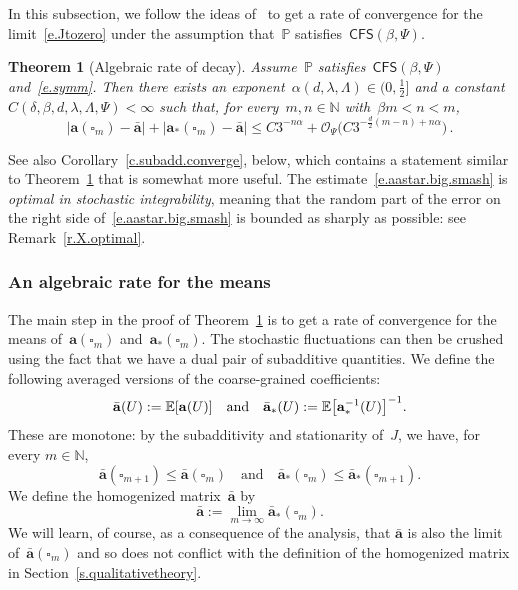 \documentclass[11pt]{article} %
\let\oldsquare\square %
\renewcommand{\square}{\oldsquare}
\numberwithin{equation}{section}
\newtheorem{theorem}{Theorem}[section]
\theoremstyle{definition}
\let\originalleft\left
\let\originalright\right
\renewcommand{\left}{\mathopen{}\mathclose\bgroup\originalleft}
\renewcommand{\right}{\aftergroup\egroup\originalright}
\newcommand*{\N}{\ensuremath{\mathbb{N}}}
\renewcommand{\a}{\mathbf{a}}
\newcommand{\ahom}{\bar{\a}}
\newcommand{\cu}{\square}
\renewcommand{\P}{\mathbb{P}}
\newcommand{\E}{\mathbb{E}}
\renewcommand{\O}{\mathcal{O}}
\newcommand{\CFS}{\mathsf{CFS}}
\begin{document}
In this subsection, we follow the ideas of~\cite{AS,AKMBook} to get a rate of convergence for the limit~\eqref{e.Jtozero} under the assumption that~$\P$ satisfies~$\CFS(\beta,\Psi)$. 

\smallskip

\begin{theorem}[{Algebraic rate of decay}]
\label{t.subadd.converge}
Assume~$\P$ satisfies~$\CFS(\beta,\Psi)$ and~\eqref{e.symm}. 
Then there exists an exponent~$\alpha(d,\lambda,\Lambda) \in (0,\tfrac12]$ 
and a constant~$C(\delta,\beta,d,\lambda,\Lambda,\Psi)<\infty$
such that, for every~$m,n \in\N$ with~$\beta m < n < m$, 
\begin{equation}
\label{e.aastar.big.smash}
| \a(\cu_m) - \ahom | 
+
|\a_*(\cu_m) - \ahom |
\leq 
C3^{-n\alpha}
+ 
\O_\Psi \bigl( C3^{-\frac d2(m-n)+ n\alpha} \bigr) 
\,.
\end{equation}
\end{theorem}

See also Corollary~\ref{c.subadd.converge}, below, which contains a statement similar to Theorem~\ref{t.subadd.converge} that is somewhat more useful. 
The estimate~\eqref{e.aastar.big.smash} is \emph{optimal in stochastic integrability}, meaning that the random part of the error on the right side of~\eqref{e.aastar.big.smash} is bounded as sharply as possible: see Remark~\ref{r.X.optimal}. 

\smallskip

\subsubsection{An algebraic rate for the means}

The main step in the proof of Theorem~\ref{t.subadd.converge} is to get a rate of convergence for the means of~$\a(\cu_m)$ and~$\a_*(\cu_m)$. The stochastic fluctuations can then be crushed using the fact that we have a dual pair of subadditive quantities. We define the following averaged versions of the coarse-grained coefficients:
\begin{equation}
\label{e.ahomahoms}
\ahom(U):= \E\left[ \a(U)\right] 
\quad \mbox{and} \quad 
\ahom_*(U):= \E\left[ \a_*^{-1}(U)\right]^{-1}.
\end{equation}
These are monotone: by the subadditivity and stationarity of~$J$, we have, for every $m\in \N$,
\begin{equation}
\label{e.matrix.subadd}
\ahom(\cu_{m+1}) \leq  \ahom(\cu_m) 
\quad \mbox{and} \quad 
\ahom_*(\cu_{m}) \leq  \ahom_*(\cu_{m+1}).
\end{equation}
We define the homogenized matrix~$\ahom$ by 
\begin{equation}
\label{e.ahom.def}
\ahom := \lim_{m\to \infty} \ahom_*(\cu_m). 
\end{equation}
We will learn, of course, as a consequence of the analysis, that $\ahom$ is also the limit of~$\ahom(\cu_m)$ and  so does not conflict with the definition of the homogenized matrix in Section~\ref{s.qualitativetheory}. 
\end{document}
